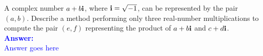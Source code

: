 \item{}
A complex number $a+b{\bf i}$, where ${\bf i}=\sqrt{-1}$, can be represented by
the pair $(a,b)$. Describe a method performing only three real-number
multiplications to compute the pair $(e,f)$ representing the product of
$a+b{\bf i}$ and $c+d{\bf i}$.\\[12pt]
\ifanswers
\textcolor{blue}{
\textbf{Answer:}\\[6pt]
Answer goes here
}
\newpage
\fi
